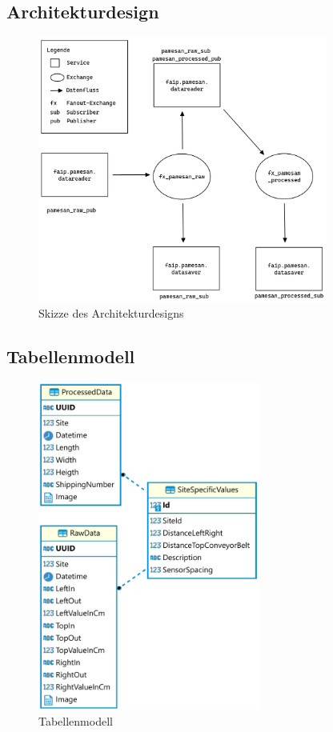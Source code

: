 \newpage
\subsection{Architekturdesign}

\begin{figure}[htpb]
  \centering
  \includegraphics[width=0.85\textwidth]{./pics/Architektur.png}
  \caption{Skizze des Architekturdesigns}
  \label{appendix:fig:datenFlussDiagramm}
\end{figure}


\newpage
\subsection{Tabellenmodell}

\begin{figure}[htpb]
  \centering
  \includegraphics[width=0.65\textwidth]{./pics/Tabellenmodell.png}
  \caption{Tabellenmodell}
  \label{appendix:fig:erm}
\end{figure}


